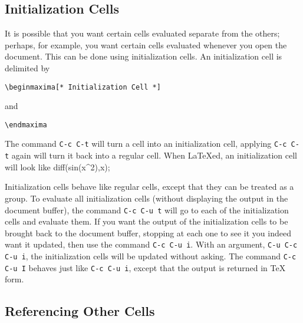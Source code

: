 \documentclass{article}
\begin{document}
\subsection{Initialization Cells}

\noindent
It is possible that you want certain cells evaluated separate from the
others; perhaps, for example, you want certain cells evaluated whenever
you open the document.  This can be done using initialization cells.
An initialization cell is delimited by
\begin{verbatim}
\beginmaxima[* Initialization Cell *]
\end{verbatim}
\noindent
and
\begin{verbatim}
\endmaxima
\end{verbatim}
\noindent
The command \texttt{C-c C-t} will turn a cell into
an initialization cell, applying \texttt{C-c C-t} again will turn it
back into a regular cell.  
When \LaTeX{}ed, an initialization cell will look like
diff(sin(x^2),x);
\endmaxima

Initialization cells behave like regular
cells, except that they can be treated as a group.
To evaluate all initialization cells (without displaying the output in
the document buffer), the
command \texttt{C-c C-u t} will go to each of the
initialization cells and evaluate them.
If you want the output of the initialization cells to be brought back 
to the document buffer,  stopping at each one to see it
you indeed want it updated, then use the command \texttt{C-c C-u i}.
With an argument, \texttt{C-u C-c C-u i}, the
initialization cells will be updated without asking.   The command 
\texttt{C-c C-u I} behaves just like \texttt{C-c C-u i},
except that the output is returned in \TeX{} form.

\subsection{Referencing Other Cells}
\end{document}
